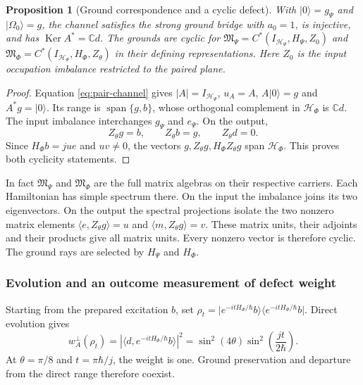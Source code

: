 \documentclass[11pt,reqno]{scrartcl}
\newcommand{\CC}{\mathbb C}
\newcommand{\scrHP}{\mathscr H_{\Psi}}
\newcommand{\scrHF}{\mathscr H_{\Phi}}
\newcommand{\algP}{\mathfrak M_{\Psi}}
\newcommand{\algF}{\mathfrak M_{\Phi}}
\newcommand{\polA}{u_A}
\newcommand{\absA}{|A|}
\newcommand{\ket}[1]{\lvert #1\rangle}
\newcommand{\bra}[1]{\langle #1\rvert}
\newcommand{\inner}[2]{\langle #1,#2\rangle}
\newcommand{\proj}[1]{\ket{#1}\!\bra{#1}}
\DeclareMathOperator{\Ker}{Ker}
\DeclareMathOperator{\Span}{span}
\newcommand{\defectWeight}{w_{A}^{\perp}}
\theoremstyle{plain}
\newtheorem{proposition}[proposition]{Proposition}
\theoremstyle{definition}
\theoremstyle{remark}
\begin{document}
\begin{proposition}[Ground correspondence and a cyclic defect]
\label{prop:pair-ground-defect}
With $\ket0=g_{\Psi}$ and $\ket{\Omega_0}=g$, the channel satisfies
the strong ground bridge with $a_0=1$, is injective, and has
$\Ker A^*=\CC d$.  The grounds are cyclic for
$\algP=C^*(I_{\scrHP},H_{\Psi},Z_0)$ and
$\algF=C^*(I_{\scrHF},H_{\Phi},Z_{\theta})$ in their defining
representations.  Here $Z_0$ is the input occupation imbalance restricted
to the paired plane.
\end{proposition}

\begin{proof}
Equation \eqref{eq:pair-channel} gives $\absA=I_{\scrHP}$,
$\polA=A$, $A\ket0=g$ and $A^*g=\ket0$.  Its range is
$\Span\{g,b\}$, whose orthogonal complement in $\scrHF$ is $\CC d$.
The input imbalance interchanges $g_{\Psi}$ and $e_{\Psi}$.
On the output,
\begin{equation}
  Z_{\theta}g=b,\qquad Z_{\theta}b=g,\qquad Z_{\theta}d=0 .
  \label{eq:pair-readout-action}
\end{equation}
Since $H_{\Phi}b=ju e$ and $uv\ne0$, the vectors
$g,Z_{\theta}g,H_{\Phi}Z_{\theta}g$ span $\scrHF$.
This proves both cyclicity statements.
\end{proof}

In fact $\algP$ and $\algF$ are the full matrix algebras on their
respective carriers.  Each Hamiltonian has simple spectrum there.
On the input the imbalance joins its two eigenvectors.  On the output
the spectral projections isolate the two nonzero matrix elements
$\inner{e}{Z_\theta g}=u$ and $\inner{m}{Z_\theta g}=v$.
These matrix units, their adjoints and their products give all matrix
units.  Every nonzero vector is therefore cyclic.  The ground rays
are selected by $H_\Psi$ and $H_\Phi$.

\subsubsection*{Evolution and an outcome measurement of defect weight}
Starting from the prepared excitation $b$, set
$\rho_t=\proj{e^{-itH_{\Phi}/\hbar}b}$.  Direct evolution gives
\begin{equation}
  \defectWeight(\rho_t)
  =|\inner{d}{e^{-itH_{\Phi}/\hbar}b}|^2
  =\sin^2(4\theta)\sin^2\!\left(\frac{jt}{2\hbar}\right).
  \label{eq:pair-defect-evolution}
\end{equation}
At $\theta=\pi/8$ and $t=\pi\hbar/j$, the weight is one.
Ground preservation and departure from the direct range therefore coexist.
\end{document}
